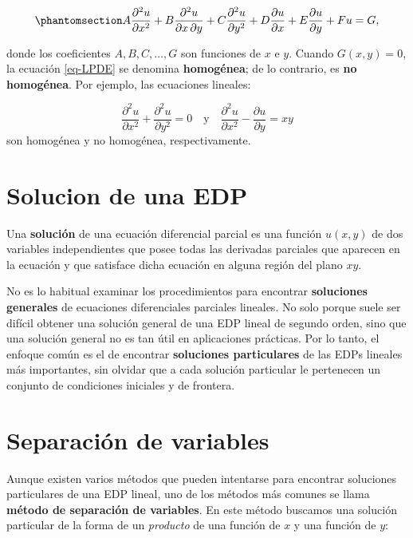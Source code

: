 \documentclass[
  spanish,
  us-letterpaper,
]{scrreprt}
\theoremstyle{plain}
\theoremstyle{definition}
\theoremstyle{remark}
\begin{document}
\begin{equation}\phantomsection\label{eq-LPDE}{
A \dfrac{\partial^2 u}{\partial x^2} + B \dfrac{\partial^2 u}{\partial x \, \partial y} + C \dfrac{\partial^2 u}{\partial y^2} + D \dfrac{\partial u}{\partial x} + E \dfrac{\partial u}{\partial y} + F u = G,
}\end{equation}

donde los coeficientes \(A, B, C, \dots, G\) son funciones de \(x\) e
\(y\). Cuando \(G(x, y) = 0\), la ecuación \ref{eq-LPDE} se denomina
\textbf{homogénea}; de lo contrario, es \textbf{no homogénea}. Por
ejemplo, las ecuaciones lineales:

\[
\dfrac{\partial^2 u}{\partial x^2} + \dfrac{\partial^2 u}{\partial y^2} = 0 \quad\text{y} \quad \dfrac{\partial^2 u}{\partial x^2} - \dfrac{\partial u}{\partial y} = x y
\] son homogénea y no homogénea, respectivamente.

\section{Solucion de una EDP}\label{solucion-de-una-edp}

Una \textbf{solución} de una ecuación diferencial parcial es una función
\(u(x, y)\) de dos variables independientes que posee todas las
derivadas parciales que aparecen en la ecuación y que satisface dicha
ecuación en alguna región del plano \(xy\).

No es lo habitual examinar los procedimientos para encontrar
\textbf{soluciones generales} de ecuaciones diferenciales parciales
lineales. No solo porque suele ser difícil obtener una solución general
de una EDP lineal de segundo orden, sino que una solución general no es
tan útil en aplicaciones prácticas. Por lo tanto, el enfoque común es el
de encontrar \textbf{soluciones particulares} de las EDPs lineales más
importantes, sin olvidar que a cada solución particular le pertenecen un
conjunto de condiciones iniciales y de frontera.

\section{Separación de variables}\label{separaciuxf3n-de-variables}

Aunque existen varios métodos que pueden intentarse para encontrar
soluciones particulares de una EDP lineal, uno de los métodos más
comunes se llama \textbf{método de separación de variables}. En este
método buscamos una solución particular de la forma de un
\emph{producto} de una función de \(x\) y una función de \(y\):
\end{document}
